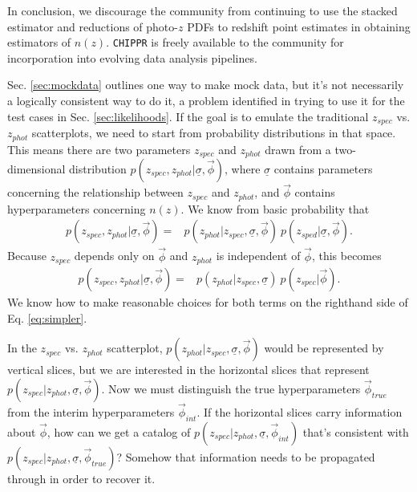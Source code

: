 \documentclass[iop]{emulateapj}
\newcommand{\textul}{\underline}
\newcommand{\chippr}{\texttt{CHIPPR} }
\begin{document}
In conclusion, we discourage the community from continuing to use the stacked 
estimator and reductions of photo-$z$ PDFs to redshift point estimates in 
obtaining estimators of $n(z)$.  \chippr is freely available to the community 
for incorporation into evolving data analysis pipelines.  


\label{app:catalog}

Sec. \ref{sec:mockdata} outlines one way to make mock data, but it's not 
necessarily a logically consistent way to do it, a problem identified in trying 
to use it for the test cases in Sec. \ref{sec:likelihoods}.  If the goal is to 
emulate the traditional $z_{spec}$ vs. $z_{phot}$ scatterplots, we need to 
start from probability distributions in that space.  This means there are two 
parameters $z_{spec}$ and $z_{phot}$ drawn from a two-dimensional distribution 
$p(z_{spec}, z_{phot} | \textul{\sigma}, \vec{\phi})$, where $\textul{\sigma}$ 
contains parameters concerning the relationship between $z_{spec}$ and 
$z_{phot}$, and $\vec{\phi}$ contains hyperparameters concerning $n(z)$.  We 
know from basic probability that
\begin{align}
\label{eq:trivial}
p(z_{spec}, z_{phot} | \textul{\sigma}, \vec{\phi}) =& p(z_{phot} | z_{spec}, 
\textul{\sigma}, \vec{\phi})\ p(z_{sped} | \textul{\sigma}, \vec{\phi}).
\end{align}
Because $z_{spec}$ depends only on $\vec{\phi}$ and $z_{phot}$ is independent 
of $\vec{\phi}$, this becomes
\begin{align}
\label{eq:simpler}
p(z_{spec}, z_{phot} | \textul{\sigma}, \vec{\phi}) =& p(z_{phot} | z_{spec}, 
\textul{\sigma})\ p(z_{spec} | \vec{\phi}).
\end{align}
We know how to make reasonable choices for both terms on the righthand side of 
Eq. \ref{eq:simpler}.

In the $z_{spec}$ vs. $z_{phot}$ scatterplot, $p(z_{phot} | z_{spec}, 
\textul{\sigma}, \vec{\phi})$ would be represented by vertical slices, but we 
are interested in the horizontal slices that represent $p(z_{spec} | z_{phot}, 
\textul{\sigma}, \vec{\phi})$.  Now we must distinguish the true 
hyperparameters $\vec{\phi}_{true}$ from the interim hyperparameters 
$\vec{\phi}_{int}$.  If the horizontal slices carry information about 
$\vec{\phi}$, how can we get a catalog of $p(z_{spec} | z_{phot}, 
\textul{\sigma}, \vec{\phi}_{int})$ that's consistent with $p(z_{spec} | 
z_{phot}, \textul{\sigma}, \vec{\phi}_{true})$?  Somehow that information needs 
to be propagated through in order to recover it.
\end{document}
